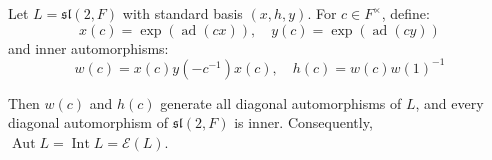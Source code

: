 Let $L = \mathfrak{sl}(2, F)$ with standard basis $(x, h, y)$. For $c \in F^\times$, define:
$$x(c) = \exp(\operatorname{ad}(c x)), \quad y(c) = \exp(\operatorname{ad}(c y))$$
and inner automorphisms:
$$w(c) = x(c) y(-c^{-1}) x(c), \quad h(c) = w(c) w(1)^{-1}$$

Then $w(c)$ and $h(c)$ generate all diagonal automorphisms of $L$, and every diagonal automorphism of $\mathfrak{sl}(2, F)$ is inner. Consequently, $\operatorname{Aut} L = \operatorname{Int} L = \mathcal{E}(L)$.
